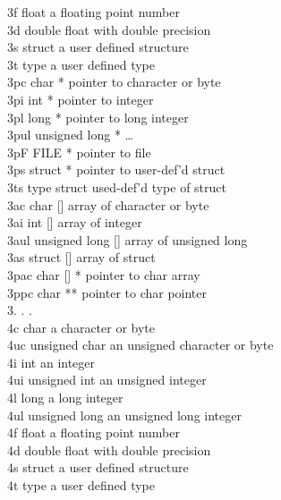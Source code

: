 \begin{mylist}
3f        float                   a floating point number\\
3d        double          float with double precision\\
3s        struct          a user defined structure\\
3t        type                    a user defined type\\
3pc       char *          pointer to character or byte\\
3pi       int *                   pointer to integer\\
3pl       long *          pointer to long integer\\
3pul      unsigned long *         \dots\\
3pF       FILE *          pointer to file\\
3ps       struct *                pointer to user-def'd struct\\
3ts       type struct             used-def'd type of struct\\
3ac       char []                 array of character or byte\\
3ai       int []          array of integer\\
3aul      unsigned long []        array of unsigned long\\
3as       struct []               array of struct\\
3pac      char [] *               pointer to char array\\
3ppc      char **                 pointer to char pointer\\
3.          .                     . \\
4c        char                    a character or byte\\
4uc       unsigned char           an unsigned character or byte\\
4i        int                     an integer\\
4ui       unsigned int            an unsigned integer\\
4l        long                    a long integer\\
4ul       unsigned long           an unsigned long integer\\
4f        float                   a floating point number\\
4d        double          float with double precision\\
4s        struct          a user defined structure\\
4t        type                    a user defined type\\

\end{mylist}
